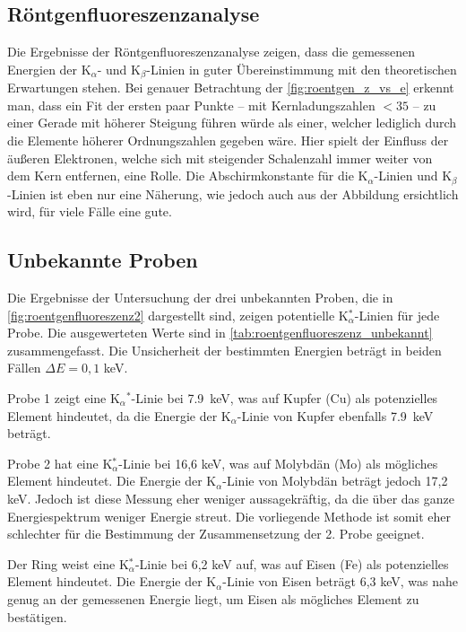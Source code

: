 \documentclass[ngerman]{scrartcl}
\begin{document}
\subsection{Röntgenfluoreszenzanalyse}
\label{sec:diskussion_roentgen}
Die Ergebnisse der Röntgenfluoreszenzanalyse zeigen, dass die gemessenen Energien der K$_{\alpha}$- und K$_{\beta}$-Linien in guter Übereinstimmung mit den theoretischen Erwartungen stehen. Bei genauer Betrachtung der \autoref{fig:roentgen_z_vs_e} erkennt man, dass ein Fit der ersten paar Punkte -- mit Kernladungszahlen $<35$ -- zu einer Gerade mit höherer Steigung führen würde als einer, welcher lediglich durch die Elemente höherer Ordnungszahlen gegeben wäre. Hier spielt der Einfluss der äußeren Elektronen, welche sich mit steigender Schalenzahl immer weiter von dem Kern entfernen, eine Rolle. Die Abschirmkonstante für die K$_{\alpha}$-Linien und K$_{\beta}$-Linien ist eben nur eine Näherung, wie jedoch auch aus der Abbildung ersichtlich wird, für viele Fälle eine gute.

\subsection{Unbekannte Proben}
\label{sec:diskussion_unbekannt}

Die Ergebnisse der Untersuchung der drei unbekannten Proben, die in \autoref{fig:roentgenfluoreszenz2} dargestellt sind, zeigen potentielle K$_{\alpha}^*$-Linien für jede Probe. Die ausgewerteten Werte sind in \autoref{tab:roentgenfluoreszenz_unbekannt} zusammengefasst. Die Unsicherheit der bestimmten Energien beträgt in beiden Fällen $\Delta E = 0,1$ keV.

Probe 1 zeigt eine K${_\alpha}^*$-Linie bei \SI{7.9}{\kilo\electronvolt}, was auf Kupfer (Cu) als potenzielles Element hindeutet, da die Energie der K${_\alpha}$-Linie von Kupfer ebenfalls \SI{7.9}{\kilo\electronvolt} beträgt.

Probe 2 hat eine K$_{\alpha}^*$-Linie bei 16,6 keV, was auf Molybdän (Mo) als mögliches Element hindeutet. Die Energie der K$_{\alpha}$-Linie von Molybdän beträgt jedoch 17,2 keV. Jedoch ist diese Messung eher weniger aussagekräftig, da die über das ganze Energiespektrum weniger Energie streut. Die vorliegende Methode ist somit eher schlechter für die Bestimmung der Zusammensetzung der 2. Probe geeignet.

Der Ring weist eine K$_{\alpha}^*$-Linie bei 6,2 keV auf, was auf Eisen (Fe) als potenzielles Element hindeutet. Die Energie der K$_{\alpha}$-Linie von Eisen beträgt 6,3 keV, was nahe genug an der gemessenen Energie liegt, um Eisen als mögliches Element zu bestätigen.
\end{document}

